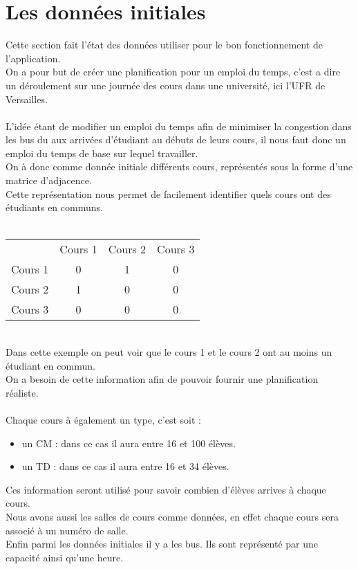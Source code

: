 \documentclass[a4paper,11pt]{article}
\begin{document}
\section{Les données initiales}
	Cette section fait l'état des données utiliser pour le bon fonctionnement de l'application.\\
	On a pour but de créer une planification pour un emploi du temps, c'est a dire un déroulement sur une journée des cours dans une université, ici l'UFR de Versailles.\\
	\\
	L'idée étant de modifier un emploi du temps afin de minimiser la congestion dans les bus du aux arrivées d'étudiant au débuts de leurs cours, il nous faut donc un emploi du temps de base sur lequel travailler.\\
	On à donc comme donnée initiale différents cours, représentés sous la forme d'une matrice d'adjacence. \\
	Cette représentation nous permet de facilement identifier quels cours ont des étudiants en communs.\\
	\\
	\begin{tabular}{ | c | c | c | c |}
		\hline			
		\       & Cours 1 & Cours 2 & Cours 3\\
		Cours 1 &   0     &    1    &     0  \\
		Cours 2 &   1     &    0    &     0  \\
		Cours 3 &   0     &    0    &     0  \\
		\hline  
	\end{tabular}\\
	Dans cette exemple on peut voir que le cours 1 et le cours 2 ont au moins un étudiant en commun.\\
	On a besoin de cette information afin de pouvoir fournir une planification réaliste.\\
	\\
	Chaque cours à également un type, c'est soit :
		\begin{itemize}
			\item un CM : dans ce cas il aura entre 16 et 100 élèves.
			\item  un TD : dans ce cas il aura entre 16 et 34 élèves.
		\end{itemize}
	Ces information seront utilisé pour savoir combien d'élèves arrives à chaque cours.\\
	Nous avons aussi les salles de cours comme données, en effet chaque cours sera associé à un numéro de salle.
	\\
	Enfin parmi les données initiales il y a les bus. Ils sont représenté par une capacité ainsi qu'une heure. 
\end{document}
